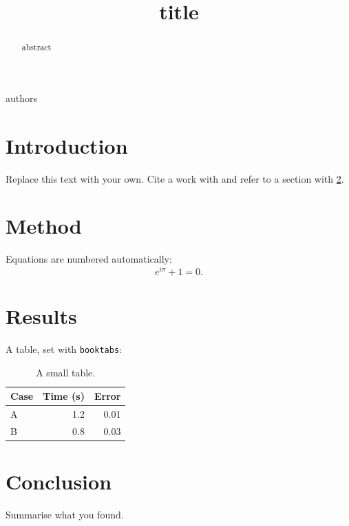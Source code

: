 \documentclass[aps,prl,twocolumn,superscriptaddress]{revtex4-2}
\begin{document}
\title{{{title}}}
{{authors}}
\begin{abstract}
{{abstract}}
\end{abstract}
\maketitle

\section{Introduction}
Replace this text with your own. Cite a work with \cite{knuth1984} and refer to a
section with \ref{sec:method}.

\section{Method}\label{sec:method}
Equations are numbered automatically:
\begin{equation}
  e^{i\pi} + 1 = 0.
\end{equation}

\section{Results}
A table, set with \texttt{booktabs}:
\begin{table}[h]
  \centering
  \begin{tabular}{lrr}
    \toprule
    Case & Time (s) & Error \\
    \midrule
    A & 1.2 & 0.01 \\
    B & 0.8 & 0.03 \\
    \bottomrule
  \end{tabular}
  \caption{A small table.}
  \label{tab:results}
\end{table}

\section{Conclusion}
Summarise what you found.


\end{document}
